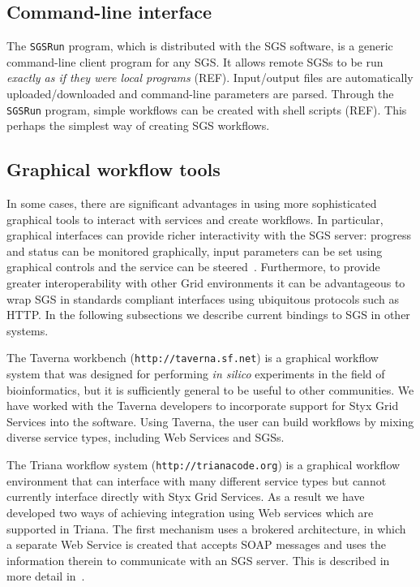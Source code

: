 \documentclass[a4paper]{article}
\begin{document}
\subsection{Command-line interface}\label{sec:sgsrun}
The \texttt{SGSRun} program, which is distributed with the SGS software, is a generic command-line client program for any SGS.  It allows remote SGSs to be run \textit{exactly as if they were local programs} (REF).  Input/output files are automatically uploaded/downloaded and command-line parameters are parsed.  Through the \texttt{SGSRun} program, simple workflows can be created with shell scripts (REF).  This perhaps the simplest way of creating SGS workflows.

\subsection{Graphical workflow tools}\label{subsec:graphical-workflow}
In some cases, there are significant advantages in using more sophisticated graphical tools to interact with services and create workflows.  In particular, graphical interfaces can provide richer interactivity with the SGS server: progress and status can be monitored graphically, input parameters can be set using graphical controls and the service can be steered~\cite{blower:2005}. Furthermore, to provide greater interoperability with other Grid environments it can be advantageous to wrap SGS in standards compliant interfaces using ubiquitous protocols such as HTTP. In the following subsections we describe current bindings to SGS in other systems.

The Taverna workbench (\texttt{http://taverna.sf.net}) is a graphical workflow system that was designed for performing {\it in silico} experiments in the field of bioinformatics, but it is sufficiently general to be useful to other communities.  We have worked with the Taverna developers to incorporate support for Styx Grid Services into the software.  Using Taverna, the user can build workflows by mixing diverse service types, including Web Services and SGSs.

The Triana workflow system (\texttt{http://trianacode.org}) is a graphical workflow environment that can interface with many different service types but cannot currently interface directly with Styx Grid Services.  As a result we have developed two ways of achieving integration using Web services which are supported in Triana. The first mechanism uses a brokered architecture, in which a separate Web Service is created that accepts SOAP messages and uses the information therein to communicate with an SGS server. This is described in more detail in~\cite{blower:2005}.
\end{document}
